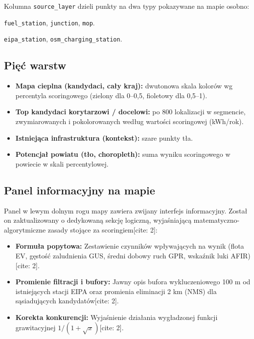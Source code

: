 \documentclass[11pt,a4paper]{article}
\begin{document}
	Kolumna \texttt{source\_layer} dzieli punkty na dwa typy pokazywane na mapie osobno:
	\begin{description}[leftmargin=0pt, style=nextline]
		\item[Kandydaci pod nową inwestycję] \texttt{fuel\_station}, \texttt{junction}, \texttt{mop}.
		\item[Istniejąca infrastruktura] \texttt{eipa\_station}, \texttt{osm\_charging\_station}.
	\end{description}
	
	\subsection{Pięć warstw}
	
	\begin{itemize}
		\item \textbf{Mapa cieplna (kandydaci, cały kraj):} dwutonowa skala kolorów wg percentyla scoringowego (zielony dla 0--0,5, fioletowy dla 0,5--1).
		\item \textbf{Top kandydaci korytarzowi / docelowi:} po 800 lokalizacji w segmencie, zwymiarowanych i pokolorowanych według wartości scoringowej (kWh/rok).
		\item \textbf{Istniejąca infrastruktura (kontekst):} szare punkty tła.
		\item \textbf{Potencjał powiatu (tło, choropleth):} suma wyniku scoringowego w powiecie w skali percentylowej.
	\end{itemize}
	
	\subsection{Panel informacyjny na mapie}
	
	Panel w lewym dolnym rogu mapy zawiera zwijany interfejs informacyjny. Został on zaktualizowany o dedykowaną sekcję logiczną, wyjaśniającą matematyczno-algorytmiczne zasady stojące za scoringiem[cite: 2]:
	
	\begin{itemize}
		\item \textbf{Formuła popytowa:} Zestawienie czynników wpływających na wynik (flota EV, gęstość zaludnienia GUS, średni dobowy ruch GPR, wskaźnik luki AFIR)[cite: 2].
		\item \textbf{Promienie filtracji i bufory:} Jawny opis bufora wykluczeniowego 100 m od istniejących stacji EIPA oraz promienia eliminacji 2 km (NMS) dla sąsiadujących kandydatów[cite: 2].
		\item \textbf{Korekta konkurencji:} Wyjaśnienie działania wygładzonej funkcji grawitacyjnej $1/(1+\sqrt{x})$[cite: 2].
	\end{itemize}
	
	
\end{document}
